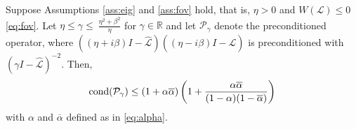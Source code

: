 \documentclass[review]{siamart}
\begin{document}
%
\begin{theorem}\label{th:cond}
Suppose Assumptions \ref{ass:eig} and \ref{ass:fov} hold, that is, $\eta > 0$
and $W(\mathcal{L}) \leq 0$ \eqref{eq:fov}. Let $\eta \leq \gamma \leq \
\tfrac{\eta^2+\beta^2}{\eta}$ for $\gamma\in\mathbb{R}$ and let
$\mathcal{P}_\gamma$ denote the preconditioned operator, where $((\eta + i\beta)I -
\widehat{\mathcal{L}})((\eta - i\beta)I - \widehat{\mathcal{L}})$ is
preconditioned with $(\gamma I - \widehat{\mathcal{L}})^{-2}$. Then,
\begin{align}\label{eq:cond1}
\textnormal{cond}(\mathcal{P}_\gamma) \leq (1 + \alpha\overline{\alpha})
		\left(1 + \frac{\alpha\overline{\alpha}}{(1 - \alpha)(1 - \overline{\alpha})}\right)
\end{align}
with $\alpha$ and $\overline{\alpha}$ defined as in \eqref{eq:alpha}.
\end{theorem}
\end{document}
